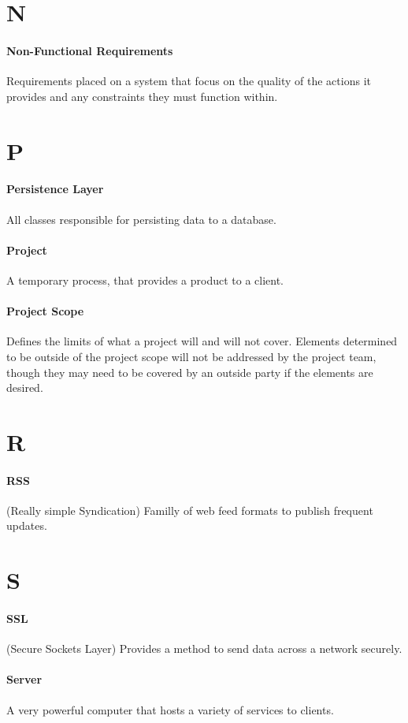 \documentclass[letterpaper,12pt]{report}
\begin{document}
\section*{N}
\paragraph{Non-Functional Requirements} Requirements placed on a system that focus on the quality of the actions it provides and any constraints they must function within.
\section*{P}
\paragraph{Persistence Layer} All classes responsible for persisting data to a database.
\paragraph{Project} A temporary process, that provides a product to a client.
\paragraph{Project Scope} Defines the limits of what a project will and will not cover.  Elements determined to be outside of the project scope will not be addressed by the project team, though they may need to be covered by an outside party if the elements are desired.

\section*{R}
\paragraph{RSS} (Really simple Syndication) Familly of web feed formats to publish frequent updates.
\section*{S}
\paragraph{SSL} (Secure Sockets Layer) Provides a method to send data across a network securely.
\paragraph{Server} A very powerful computer that hosts a variety of services to clients.
\end{document}
